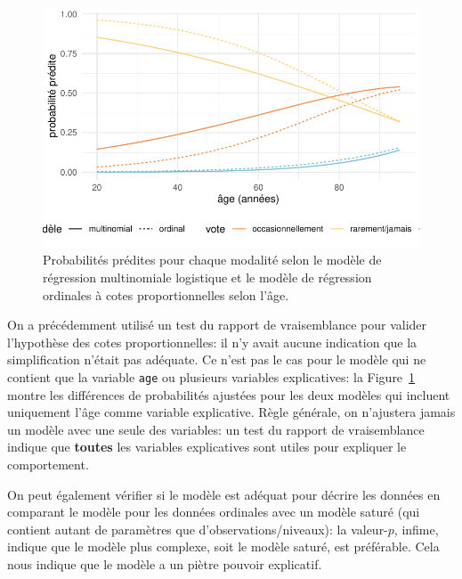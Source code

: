 \documentclass[
  11pt,
  letterpaper,
]{scrbook}
\theoremstyle{definition}
\theoremstyle{remark}
\begin{document}
\begin{figure}[ht!]

{\centering \includegraphics{reglogistique_files/figure-pdf/fig-predmultinom-1.pdf}

}

\caption{\label{fig-predmultinom}Probabilités prédites pour chaque
modalité selon le modèle de régression multinomiale logistique et le
modèle de régression ordinales à cotes proportionnelles selon l'âge.}

\end{figure}

On a précédemment utilisé un test du rapport de vraisemblance pour
valider l'hypothèse des cotes proportionnelles: il n'y avait aucune
indication que la simplification n'était pas adéquate. Ce n'est pas le
cas pour le modèle qui ne contient que la variable \texttt{age} ou
plusieurs variables explicatives: la Figure~\ref{fig-predmultinom}
montre les différences de probabilités ajustées pour les deux modèles
qui incluent uniquement l'âge comme variable explicative. Règle
générale, on n'ajustera jamais un modèle avec une seule des variables:
un test du rapport de vraisemblance indique que \textbf{toutes} les
variables explicatives sont utiles pour expliquer le comportement.

On peut également vérifier si le modèle est adéquat pour décrire les
données en comparant le modèle pour les données ordinales avec un modèle
saturé (qui contient autant de paramètres que d'observations/niveaux):
la valeur-\(p\), infime, indique que le modèle plus complexe, soit le
modèle saturé, est préférable. Cela nous indique que le modèle a un
piètre pouvoir explicatif.
\end{document}
